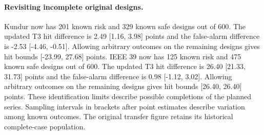 \documentclass[10pt]{article}
\begin{document}
\paragraph{Revisiting incomplete original designs.} Kundur now has 201 known risk and 329 known safe designs out of 600. The updated T3 hit difference is 2.49 [1.16, 3.98] points and the false-alarm difference is -2.53 [-4.46, -0.51]. Allowing arbitrary outcomes on the remaining designs gives hit bounds [-23.99, 27.68] points. IEEE 39 now has 125 known risk and 475 known safe designs out of 600. The updated T3 hit difference is 26.40 [21.33, 31.73] points and the false-alarm difference is 0.98 [-1.12, 3.02]. Allowing arbitrary outcomes on the remaining designs gives hit bounds [26.40, 26.40] points. These identification limits describe possible completions of the planned series. Sampling intervals in brackets after point estimates describe variation among known outcomes. The original transfer figure retains its historical complete-case population.
\end{document}
